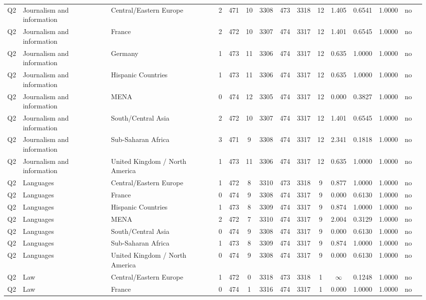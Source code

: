 \begin{longtable}{lllrcccccccccll}
Q2 & Journalism and information & Central/Eastern Europe & 2 & 471 & 10 & 3308 & 473 & 3318 & 12 & 1.405 & 0.6541 & 1.0000 & no \\
Q2 & Journalism and information & France & 2 & 472 & 10 & 3307 & 474 & 3317 & 12 & 1.401 & 0.6545 & 1.0000 & no \\
Q2 & Journalism and information & Germany & 1 & 473 & 11 & 3306 & 474 & 3317 & 12 & 0.635 & 1.0000 & 1.0000 & no \\
Q2 & Journalism and information & Hispanic Countries & 1 & 473 & 11 & 3306 & 474 & 3317 & 12 & 0.635 & 1.0000 & 1.0000 & no \\
Q2 & Journalism and information & MENA & 0 & 474 & 12 & 3305 & 474 & 3317 & 12 & 0.000 & 0.3827 & 1.0000 & no \\
Q2 & Journalism and information & South/Central Asia & 2 & 472 & 10 & 3307 & 474 & 3317 & 12 & 1.401 & 0.6545 & 1.0000 & no \\
Q2 & Journalism and information & Sub-Saharan Africa & 3 & 471 & 9 & 3308 & 474 & 3317 & 12 & 2.341 & 0.1818 & 1.0000 & no \\
Q2 & Journalism and information & United Kingdom / North America & 1 & 473 & 11 & 3306 & 474 & 3317 & 12 & 0.635 & 1.0000 & 1.0000 & no \\
Q2 & Languages & Central/Eastern Europe & 1 & 472 & 8 & 3310 & 473 & 3318 & 9 & 0.877 & 1.0000 & 1.0000 & no \\
Q2 & Languages & France & 0 & 474 & 9 & 3308 & 474 & 3317 & 9 & 0.000 & 0.6130 & 1.0000 & no \\
Q2 & Languages & Hispanic Countries & 1 & 473 & 8 & 3309 & 474 & 3317 & 9 & 0.874 & 1.0000 & 1.0000 & no \\
Q2 & Languages & MENA & 2 & 472 & 7 & 3310 & 474 & 3317 & 9 & 2.004 & 0.3129 & 1.0000 & no \\
Q2 & Languages & South/Central Asia & 0 & 474 & 9 & 3308 & 474 & 3317 & 9 & 0.000 & 0.6130 & 1.0000 & no \\
Q2 & Languages & Sub-Saharan Africa & 1 & 473 & 8 & 3309 & 474 & 3317 & 9 & 0.874 & 1.0000 & 1.0000 & no \\
Q2 & Languages & United Kingdom / North America & 0 & 474 & 9 & 3308 & 474 & 3317 & 9 & 0.000 & 0.6130 & 1.0000 & no \\
Q2 & Law & Central/Eastern Europe & 1 & 472 & 0 & 3318 & 473 & 3318 & 1 & $\infty$ & 0.1248 & 1.0000 & no \\
Q2 & Law & France & 0 & 474 & 1 & 3316 & 474 & 3317 & 1 & 0.000 & 1.0000 & 1.0000 & no \\

\end{longtable}
